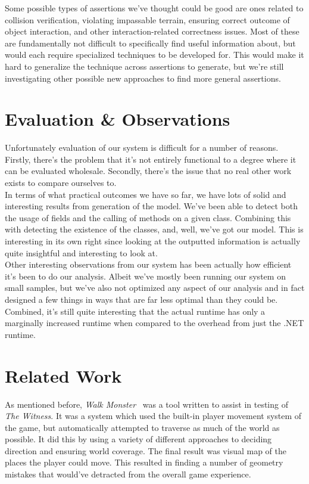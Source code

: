 \documentclass[letterpaper,twocolumn,10pt]{article}
\begin{document}
Some possible types of assertions we've thought could be good are ones related to collision verification, violating impassable terrain, ensuring correct outcome of object interaction, and other interaction-related correctness issues. Most of these are fundamentally not difficult to specifically find useful information about, but would each require specialized techniques to be developed for. This would make it hard to generalize the technique across assertions to generate, but we're still investigating other possible new approaches to find more general assertions. \\

\section{Evaluation \& Observations}

Unfortunately evaluation of our system is difficult for a number of reasons. Firstly, there's the problem that it's not entirely functional to a degree where it can be evaluated wholesale. Secondly, there's the issue that no real other work exists to compare ourselves to. \\

In terms of what practical outcomes we have so far, we have lots of solid and interesting results from generation of the model. We've been able to detect both the usage of fields and the calling of methods on a given class. Combining this with detecting the existence of the classes, and, well, we've got our model. This is interesting in its own right since looking at the outputted information is actually quite insightful and interesting to look at. \\

Other interesting observations from our system has been actually how efficient it's been to do our analysis. Albeit we've mostly been running our system on small samples, but we've also not optimized any aspect of our analysis and in fact designed a few things in ways that are far less optimal than they could be. Combined, it's still quite interesting that the actual runtime has only a marginally increased runtime when compared to the overhead from just the .NET runtime. \\

\section{Related Work}

As mentioned before, \textit{Walk Monster}~\cite{WalkMonster} was a tool written to assist in testing of \textit{The Witness}. It was a system which used the built-in player movement system of the game, but automatically attempted to traverse as much of the world as possible. It did this by using a variety of different approaches to deciding direction and ensuring world coverage. The final result was visual map of the places the player could move. This resulted in finding a number of geometry mistakes that would've detracted from the overall game experience.\\
\end{document}
